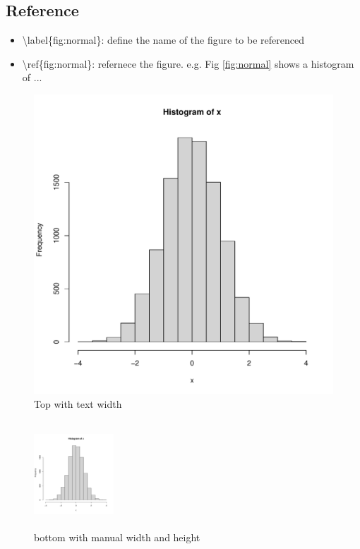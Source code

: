\documentclass[11pt]{article}
\theoremstyle{quest}
\begin{document}
\subsection{Reference}
\begin{itemize}
  \item \textbackslash label\{fig:normal\}: define the name of the figure to be referenced 
  \item \textbackslash ref\{fig:normal\}: refernece the figure. e.g. Fig \ref{fig:normal} shows a histogram of ...
\end{itemize}



\begin{figure}[t]  
\centering 
\includegraphics[width=\textwidth]{figs/normal.pdf} 
\caption{ 
  Top with text width 
}
\end{figure}

\begin{figure}[b]  
\centering 
\includegraphics[width=3cm, height=4cm]{figs/normal.pdf} 
\caption{ 
  bottom with manual width and height
}
\end{figure}
\end{document}
